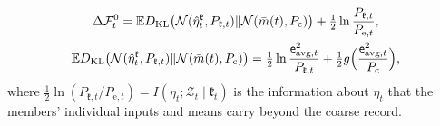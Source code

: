\begin{proposition}
\begin{enumerate}
\begin{equation}\label{eq:apx-level0-belief-coarse}
\begin{gathered}
\Delta\mathcal F^0_t=\mathbb{E}D_{\mathrm{KL}}\bigl(\mathcal{N}(\hat\eta^{\mathfrak k}_t,P_{\mathfrak k,t})\Vert\mathcal{N}(\bar m(t),P_{\mathrm c})\bigr)+\tfrac12\ln\frac{P_{\mathfrak k,t}}{P_{\mathrm e,t}},\\
\mathbb{E}D_{\mathrm{KL}}\bigl(\mathcal{N}(\hat\eta^{\mathfrak k}_t,P_{\mathfrak k,t})\Vert\mathcal{N}(\bar m(t),P_{\mathrm c})\bigr)=\tfrac12\ln\frac{\mathsf e_{\mathrm{avg},t}^2}{P_{\mathfrak k,t}}+\tfrac12g\Bigl(\frac{\mathsf e_{\mathrm{avg},t}^2}{P_{\mathrm c}}\Bigr),
\end{gathered}
\end{equation}
where $\frac12\ln(P_{\mathfrak k,t}/P_{\mathrm e,t})=I(\eta_t;\mathcal Z_t\mid\mathfrak k_t)$ is the information about $\eta_t$ that the members' individual inputs and means carry beyond the coarse record.
\end{enumerate}
\end{proposition}

